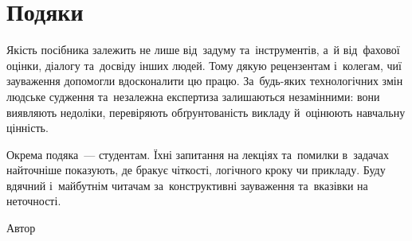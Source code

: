 \section*{Подяки}

Якість посібника залежить не лише від~задуму та~інструментів, а~й від~фахової оцінки, діалогу та~досвіду
інших людей. Тому дякую рецензентам і~колегам, чиї зауваження допомогли вдосконалити цю працю. За~будь-яких
технологічних змін людське судження та~незалежна експертиза залишаються незамінними: вони виявляють недоліки,
перевіряють обґрунтованість викладу й~оцінюють навчальну цінність.

Окрема подяка~--- студентам. Їхні запитання на лекціях та~помилки в~задачах найточніше показують, де бракує
чіткості, логічного кроку чи прикладу. Буду вдячний і~майбутнім читачам за~конструктивні зауваження та~вказівки
на неточності.

\vspace*{1em}

\begin{flushright}
	Автор
\end{flushright}
